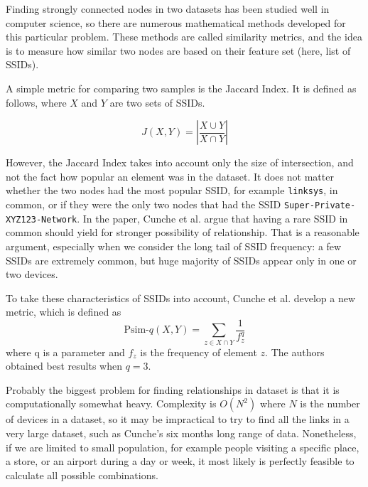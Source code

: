 \documentclass[12pt,a4paper,oneside,pdftex]{report}
\begin{document}
Finding strongly connected nodes in two datasets has been studied well in computer science, so there are numerous mathematical methods developed for this particular problem. These methods are called similarity metrics, and the idea is to measure how similar two nodes are based on their feature set (here, list of SSIDs). 

A simple metric for comparing two samples is the Jaccard Index. It is defined as follows, where $X$ and $Y$ are two sets of SSIDs.

$$J(X,Y) = \left| \frac{X \cup Y}{X \cap Y} \right| $$

However, the Jaccard Index takes into account only the size of intersection, and not the fact how popular an element was in the dataset. It does not matter whether the two nodes had the most popular SSID, for example \texttt{linksys}, in common, or if they were the only two nodes that had the SSID \texttt{Super-Private-XYZ123-Network}. In the paper, Cunche et al. argue that having a rare SSID in common should yield for stronger possibility of relationship. That is a reasonable argument, especially when we consider the long tail of SSID frequency: a few SSIDs are extremely common, but huge majority of SSIDs appear only in one or two devices.

To take these characteristics of SSIDs into account, Cunche et al. develop a new metric, which is defined as 
$$\text{Psim-}q(X,Y) = \sum_{z \in X \cap Y} \frac{1}{f_z^q}$$
where q is a parameter and $f_z$ is the frequency of element $z$. The authors obtained best results when $q=3$.~\cite{cunche2014linking}

Probably the biggest problem for finding relationships in dataset is that it is computationally somewhat heavy. Complexity is $O(N^2)$ where $N$ is the number of devices in a dataset, so it may be impractical to try to find all the links in a very large dataset, such as Cunche's six months long range of data. Nonetheless, if we are limited to small population, for example people visiting a specific place, a store, or an airport during a day or week, it most likely is perfectly feasible to calculate all possible combinations.

\end{document}
